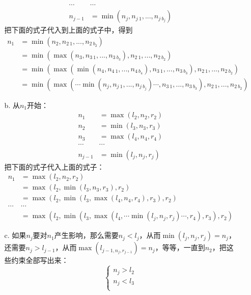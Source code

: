 \documentclass[UTF8,zihao=-4]{ctexart}
\begin{document}
\begin{itemize}
\begin{enumerate}
\begin{align*}
                \cdots & \cdots \\
                n_{j-1}&=\min(n_j,n_{j\ 1},...,n_{j\ b_j})
            \end{align*}
            把下面的式子代入到上面的式子中，得到
            \begin{align*}
                n_1&=\min(n_2,n_{2\ 1},...,n_{2\ b_2}) \\
                   &=\min(\max(n_3,n_{3\ 1},...,n_{3\ b_3}),n_{2\ 1},...,n_{2\ b_2}) \\
                   &=\min(\max(\min(n_4,n_{4\ 1},...,n_{4\ b_4}),n_{3\ 1},...,n_{3\ b_3}),n_{2\ 1},...,n_{2\ b_2}) \\
                   &=\min(\max(\cdots\min(n_j,n_{j\ 1},...,n_{j\ b_j})\cdots,n_{3\ 1},...,n_{3\ b_3}),n_{2\ 1},...,n_{2\ b_2})
            \end{align*}
            \item[b.]从$n_1$开始：
            \begin{align*}
                n_1&=\max(l_2,n_2,r_2) \\
                n_2&=\min(l_3,n_3,r_3) \\
                n_3&=\max(l_4,n_4,r_4) \\
                \cdots&\cdots \\
                n_{j-1}&=\min(l_j,n_j,r_j)
            \end{align*} 
            把下面的式子代入上面的式子：
            \begin{align*}
                n_1&=\max(l_2,n_2,r_2)\\
                   &=\max(l_2,\min(l_3,n_3,r_3),r_2)\\
                   &=\max(l_2,\min(l_3,\max(l_4,n_4,r_4),r_3),r_2)\\
                   \cdots&\cdots \\
                   &=\max(l_2,\min(l_3,\max(l_4,\cdots\min(l_j,n_j,r_j)\cdots,r_4),r_3),r_2)
            \end{align*}
            \item[c.]如果$n_j$要对$n_1$产生影响，那么需要$n_j<l_j$，从而$\min(l_j,n_j,r_j)=n_j$，还需要$n_j>l_{j-1}$，从而$\max(l_{j-1,n_j,r_{j-1}})=n_j$，等等，一直到$n_2$，把这些约束全部写出来：
            \begin{equation*}
                \begin{cases}
                    n_j > l_2 \\
                    n_j < l_3 \\

\end{cases}
\end{equation*}
\end{enumerate}
\end{itemize}
\end{document}
